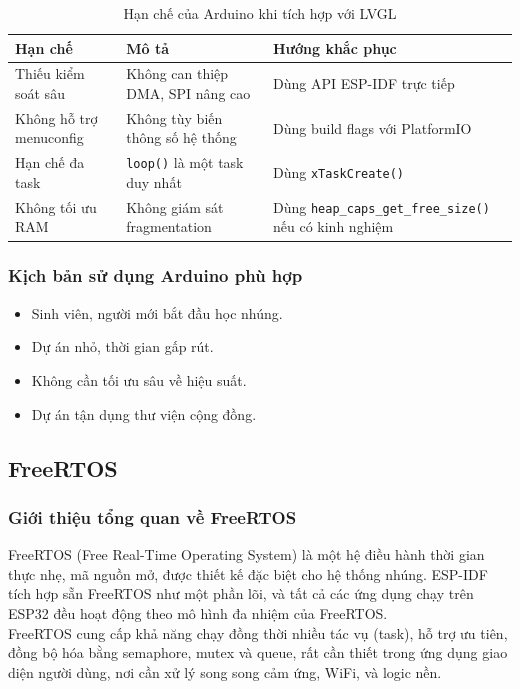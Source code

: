 \begin{table}[H]
\centering
\begin{tabular}{|l|p{5.5cm}|p{5.5cm}|}
\hline
\textbf{Hạn chế} & \textbf{Mô tả} & \textbf{Hướng khắc phục} \\
\hline
Thiếu kiểm soát sâu & Không can thiệp DMA, SPI nâng cao & Dùng API ESP-IDF trực tiếp \\
Không hỗ trợ menuconfig & Không tùy biến thông số hệ thống & Dùng build flags với PlatformIO \\
Hạn chế đa task & \texttt{loop()} là một task duy nhất & Dùng \texttt{xTaskCreate()} \\
Không tối ưu RAM & Không giám sát fragmentation & Dùng \texttt{heap\_caps\_get\_free\_size()} nếu có kinh nghiệm \\
\hline
\end{tabular}
\caption{Hạn chế của Arduino khi tích hợp với LVGL}
\end{table}

\subsubsection{Kịch bản sử dụng Arduino phù hợp}

\begin{itemize}
    \item Sinh viên, người mới bắt đầu học nhúng.
    \item Dự án nhỏ, thời gian gấp rút.
    \item Không cần tối ưu sâu về hiệu suất.
    \item Dự án tận dụng thư viện cộng đồng.
\end{itemize}

\subsection{FreeRTOS}

\subsubsection{Giới thiệu tổng quan về FreeRTOS}
FreeRTOS (Free Real-Time Operating System) là một hệ điều hành thời gian thực nhẹ, mã nguồn mở, được thiết kế đặc biệt cho hệ thống nhúng. ESP-IDF tích hợp sẵn FreeRTOS như một phần lõi, và tất cả các ứng dụng chạy trên ESP32 đều hoạt động theo mô hình đa nhiệm của FreeRTOS.\\
FreeRTOS cung cấp khả năng chạy đồng thời nhiều tác vụ (task), hỗ trợ ưu tiên, đồng bộ hóa bằng semaphore, mutex và queue, rất cần thiết trong ứng dụng giao diện người dùng, nơi cần xử lý song song cảm ứng, WiFi, và logic nền.

